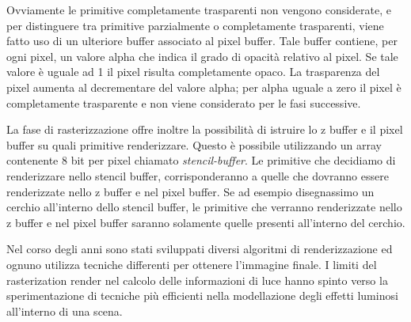 Ovviamente le primitive completamente trasparenti non vengono considerate, e per  distinguere tra primitive parzialmente o completamente trasparenti, viene fatto uso di un ulteriore buffer associato al pixel buffer. Tale buffer contiene, per ogni pixel, un valore alpha che indica il grado di opacità relativo al pixel. Se tale valore è uguale ad 1 il pixel risulta completamente opaco. La trasparenza del pixel aumenta al decrementare del valore alpha; per alpha uguale a zero il pixel è completamente trasparente e non viene considerato per le fasi successive.

La fase di rasterizzazione offre inoltre la possibilità di istruire lo z buffer e il pixel buffer su quali primitive renderizzare. Questo è possibile utilizzando un array contenente 8 bit per pixel chiamato \emph{stencil-buffer}. Le primitive che decidiamo di renderizzare nello stencil buffer, corrisponderanno a quelle che dovranno essere renderizzate nello z buffer e nel pixel buffer. Se ad esempio disegnassimo un cerchio all’interno dello stencil buffer, le primitive che verranno renderizzate nello z buffer e nel pixel buffer saranno solamente quelle presenti all’interno del cerchio.

Nel corso degli anni sono stati sviluppati diversi algoritmi di renderizzazione ed ognuno utilizza tecniche differenti per ottenere l’immagine finale. I limiti del rasterization render nel calcolo delle informazioni di luce hanno spinto verso la sperimentazione di tecniche più efficienti nella modellazione degli effetti luminosi all’interno di una scena.